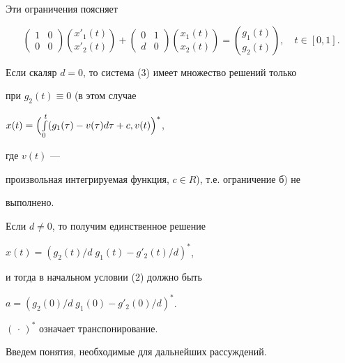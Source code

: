 Эти ограничения поясняет





\begin{exam}


\begin{equation}


\begin{pmatrix}


1 & 0\\


0 & 0


\end{pmatrix}


\binom{x'_1(t)}{x'_2(t)}+


\begin{pmatrix}


0 & 1\\


d& 0


\end{pmatrix}


\binom{x_1(t)}{x_2(t)}=\binom{g_1(t)}{g_2(t)},


\quad t\in[0,1].


\end{equation}





Если скаляр $d=0$, то система (3) имеет множество решений только


при $g_2(t)\equiv 0$ (в этом случае


$x(t)=\Bigl(\int\limits^t_0(g_1(\tau)-v(\tau)d\tau+c,v(t)\Bigr)^*$,


где $v(t)$ ---


произвольная интегрируемая функция, $c\in R$), т.е. ограничение б) не


выполнено.


Если $d\ne 0$, то получим единственное решение


$x(t)=(g_2(t)/d\;g_1(t)-g'_2(t)/d)^*$,


и тогда в начальном условии (2) должно быть


$a=(g_2(0)/d\;g_1(0)-g'_2(0)/d)^*$.


$(\,\cdot\,)^*$ означает транспонирование.


\end{exam}





Введем понятия, необходимые для дальнейших рассуждений.





